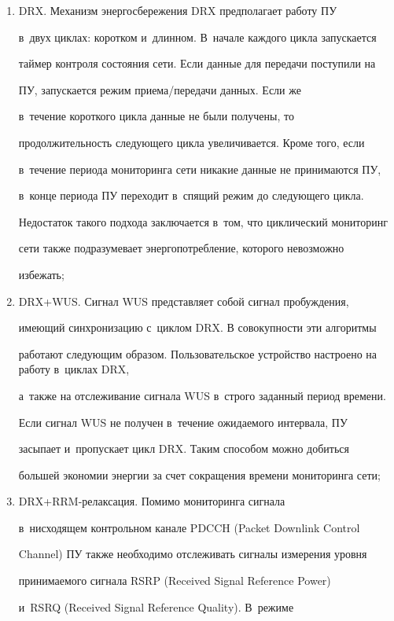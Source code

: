      \begin{enumerate}[(1)]


\item DRX. Механизм энергосбережения DRX предполагает работу ПУ 


в~двух циклах: коротком и~длинном. В~начале каждого цикла запускается 


таймер контроля состояния сети. Если данные для передачи поступили на 


ПУ, запускается режим при\-е\-ма\!/\!пе\-ре\-да\-чи данных. Если же 


в~течение короткого цикла данные не были получены, то 


продолжительность следующего цикла увеличивается. Кроме того, если 


в~течение периода мониторинга сети никакие данные не принимаются ПУ, 


в~конце периода ПУ переходит в~спящий режим до следующего цикла. 


Недостаток такого подхода заключается в~том, что циклический мониторинг 


сети также подразумевает энергопотребление, которого невозможно 


избежать;


\item DRX\;+\;WUS. Сигнал WUS представляет собой сигнал пробуждения, 


имеющий синхронизацию с~циклом DRX. В совокупности эти алгоритмы 


работают следующим образом. Пользовательское устройство настроено на работу в~циклах DRX, 


а~также на отслеживание сигнала WUS в~строго заданный период времени. 


Если сигнал WUS не получен в~течение ожидаемого интервала, ПУ 


засыпает и~пропускает цикл DRX. Таким способом можно добиться 


большей экономии энергии за счет сокращения времени мониторинга сети;


\item DRX\;+\;RRM-релаксация. Помимо мониторинга сигнала 


в~нисходящем контрольном канале PDCCH (Packet Downlink Control 


Channel) ПУ также необходимо отслеживать сигналы измерения уровня 


принимаемого сигнала RSRP (Received Signal Reference Power) 


и~RSRQ (Received Signal Reference Quality). В~режиме  



\end{enumerate}
